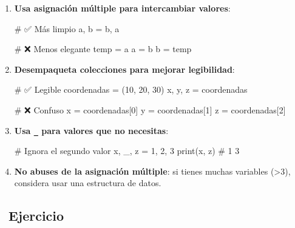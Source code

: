 \documentclass[
  doc,
  floatsintext,
  longtable,
  a4paper,
  nolmodern,
  notxfonts,
  notimes,
  12pt,
  colorlinks=true,linkcolor=blue,citecolor=blue,urlcolor=blue]{apa7}
\newenvironment{Shaded}{\begin{snugshade}}{\end{snugshade}}
\newcommand{\BuiltInTok}[1]{\textcolor[rgb]{0.00,0.23,0.31}{#1}}
\newcommand{\CommentTok}[1]{\textcolor[rgb]{0.37,0.37,0.37}{#1}}
\newcommand{\DecValTok}[1]{\textcolor[rgb]{0.68,0.00,0.00}{#1}}
\newcommand{\NormalTok}[1]{\textcolor[rgb]{0.00,0.23,0.31}{#1}}
\newcommand{\OperatorTok}[1]{\textcolor[rgb]{0.37,0.37,0.37}{#1}}
\begin{document}
\begin{enumerate}
\def\labelenumi{\arabic{enumi}.}
\item
  \textbf{Usa asignación múltiple para intercambiar valores}:

\begin{Shaded}
\begin{Highlighting}[]
\CommentTok{\# ✅ Más limpio}
\NormalTok{a, b }\OperatorTok{=}\NormalTok{ b, a}

\CommentTok{\# ❌ Menos elegante}
\NormalTok{temp }\OperatorTok{=}\NormalTok{ a}
\NormalTok{a }\OperatorTok{=}\NormalTok{ b}
\NormalTok{b }\OperatorTok{=}\NormalTok{ temp}
\end{Highlighting}
\end{Shaded}
\item
  \textbf{Desempaqueta colecciones para mejorar legibilidad}:

\begin{Shaded}
\begin{Highlighting}[]
\CommentTok{\# ✅ Legible}
\NormalTok{coordenadas }\OperatorTok{=}\NormalTok{ (}\DecValTok{10}\NormalTok{, }\DecValTok{20}\NormalTok{, }\DecValTok{30}\NormalTok{)}
\NormalTok{x, y, z }\OperatorTok{=}\NormalTok{ coordenadas}

\CommentTok{\# ❌ Confuso}
\NormalTok{x }\OperatorTok{=}\NormalTok{ coordenadas[}\DecValTok{0}\NormalTok{]}
\NormalTok{y }\OperatorTok{=}\NormalTok{ coordenadas[}\DecValTok{1}\NormalTok{]}
\NormalTok{z }\OperatorTok{=}\NormalTok{ coordenadas[}\DecValTok{2}\NormalTok{]}
\end{Highlighting}
\end{Shaded}
\item
  \textbf{Usa \texttt{\_} para valores que no necesitas}:

\begin{Shaded}
\begin{Highlighting}[]
\CommentTok{\# Ignora el segundo valor}
\NormalTok{x, \_, z }\OperatorTok{=} \DecValTok{1}\NormalTok{, }\DecValTok{2}\NormalTok{, }\DecValTok{3}
\BuiltInTok{print}\NormalTok{(x, z)  }\CommentTok{\# 1 3}
\end{Highlighting}
\end{Shaded}
\item
  \textbf{No abuses de la asignación múltiple}: si tienes muchas
  variables (\textgreater3), considera usar una estructura de datos.
\end{enumerate}

\subsection{📝 Ejercicio}\label{ejercicio}
\end{document}
